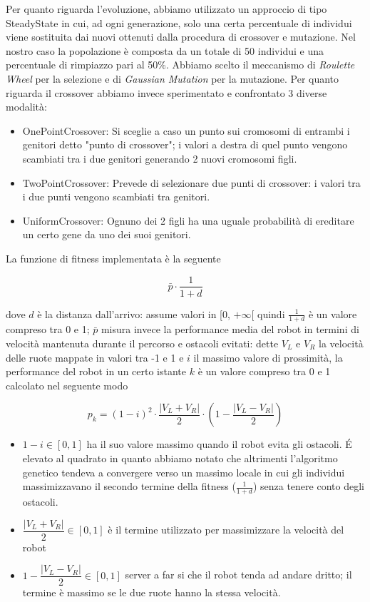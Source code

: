 \documentclass[UTF8]{article}
\begin{document}
Per quanto riguarda l'evoluzione, abbiamo utilizzato un approccio di tipo SteadyState in cui, ad ogni generazione, solo una certa percentuale di individui viene sostituita dai nuovi ottenuti dalla procedura di crossover e mutazione. Nel nostro caso la popolazione è composta da un totale di 50 individui e una percentuale di rimpiazzo pari al 50\%.  Abbiamo scelto il meccanismo di \textit{Roulette Wheel} per la selezione e di \textit{Gaussian Mutation} per la mutazione.
Per quanto riguarda il crossover abbiamo invece sperimentato e confrontato 3 diverse modalità: 
\begin{itemize}
\item{OnePointCrossover}: Si sceglie a caso un punto sui cromosomi di entrambi i genitori detto "punto di crossover"; i valori a destra di quel punto vengono scambiati tra i due genitori generando 2 nuovi cromosomi figli.
\item{TwoPointCrossover}: Prevede di selezionare due punti di crossover: i valori tra i due punti vengono scambiati tra genitori.
\item{UniformCrossover}: Ognuno dei 2 figli ha una uguale probabilità di ereditare un certo gene da uno dei suoi genitori.
 \end{itemize}

La funzione di fitness implementata è la seguente

\[\bar{p} \cdot \frac{1}{1+d}\]

dove $d$ è la distanza dall'arrivo: assume valori in [0, $+\infty$[ quindi $\frac{1}{1+d}$ è un valore compreso tra 0 e 1; $\bar{p}$ misura invece la performance media del robot in termini di velocità mantenuta durante il percorso e ostacoli evitati: dette $V_L$ e $V_R$ la velocità delle ruote mappate in valori tra -1 e 1 e $i$ il massimo valore di prossimità, la performance del robot in un certo istante $k$ è un valore compreso tra 0 e 1 calcolato nel seguente modo

\[p_k = (1-i)^2 \cdot \frac{|V_L+V_R|}{2} \cdot (1-\frac{|V_L-V_R|}{2})\]

\begin{itemize}
    \item $1-i \in [0,1]$ ha il suo valore massimo quando il robot evita gli ostacoli. \'E elevato al quadrato in quanto abbiamo notato che altrimenti l'algoritmo genetico tendeva a convergere verso un massimo locale in cui gli individui massimizzavano il secondo termine della fitness ($\frac{1}{1+d}$) senza tenere conto degli ostacoli.
    \item $\dfrac{|V_L+V_R|}{2} \in [0,1]$ è il termine utilizzato per massimizzare la velocità del robot
    \item $1-\dfrac{|V_L-V_R|}{2}  \in [0,1]$ server a far si che il robot tenda ad andare dritto; il termine è massimo se le due ruote hanno la stessa velocità.
\end{itemize}
\end{document}
